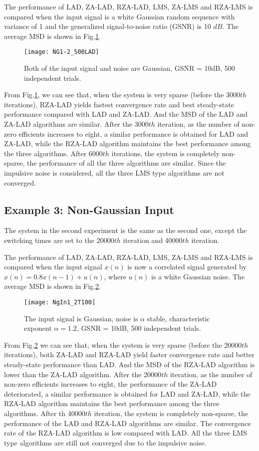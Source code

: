 \documentclass[conference]{IEEEtran}
\begin{document}
The performance of LAD, ZA-LAD, RZA-LAD, LMS, ZA-LMS and RZA-LMS is compared when the input signal is a white Gaussian random sequence with variance
of 1 and the generalized signal-to-noise ratio (GSNR) is 10 $dB$. The average MSD is shown in Fig.\ref{fig1_g}. 
\begin{figure}[!ht]
\centering
\texttt{[image: NG1-2\_500LAD]}
\caption{Both of the input signal and noise are Gaussian, GSNR = 10dB, 500 independent trials.}
\label{fig1_g}
\end{figure}

From Fig.\ref{fig1_g}, we can see that, when the system is very sparse (before the 3000$th$ iterations),  RZA-LAD yields fastest convergence rate and best steady-state performance compared with LAD and ZA-LAD. And the MSD of the LAD  and ZA-LAD algorithms are similar. After the 3000$th$ iteration, as the number of non-zero efficients increases to eight, a similar performance is obtained for LAD and ZA-LAD, while the RZA-LAD algorithm maintains the best performance among the three algorithms. After 6000$th$ iterations, the system is completely non-sparse, the performance of all the three algorithms are similar.
Since the impulsive noise is considered, all the three LMS type algorithms are not converged.

\subsection {Example 3: Non-Gaussian Input}
\label{S4-3}
The system in the second experiment is the same as the second one, except the switching times are set to the 20000$th$ iteration and 40000$th$ iteration. 

The performance of LAD, ZA-LAD, RZA-LAD, LMS, ZA-LMS and RZA-LMS is compared when the input signal $x(n)$ is now a correlated signal generated by $x(n)=0.8x(n-1)+u(n)$, where $u(n)$ is a white Gaussian noise. The average MSD is shown in Fig.\ref{fig2_ng}. 
\begin{figure}[!ht]
\centering
\texttt{[image: NgIn1\_2T100]}
\caption{The input signal is Gaussian, noise is $\alpha$  stable, characteristic exponent  $\alpha  = 1.2$, GSNR = 10dB, 500 independent trials.}
\label{fig2_ng}
\end{figure}

From Fig.\ref{fig2_ng} we can see that, when the system is very sparse (before the 20000$th$ iterations), both  ZA-LAD and RZA-LAD yield faster convergence rate and better steady-state performance than LAD. And the MSD of the RZA-LAD algorithm is lower than the ZA-LAD algorithm. After the 20000$th$ iteration, as the number of non-zero efficients increases to eight, the performance of the ZA-LAD deteriorated, a similar performance is obtained for LAD and ZA-LAD, while the RZA-LAD algorithm maintains the best performance among the three algorithms. After th 40000$th$ iteration, the system is completely non-sparse, the performance of the LAD and RZA-LAD algorithms are similar.
The convergence rate of the RZA-LAD algorithm is low compared with LAD.
All the three LMS type algorithms are still not converged due to the impulsive noise.
\end{document}
